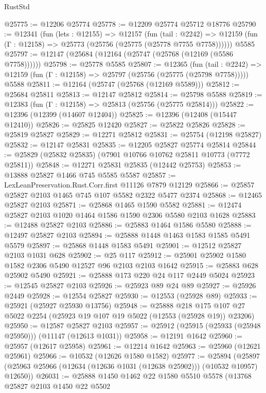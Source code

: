 \begin{lexlean}{RustStd}
\begin{coremodule}
@25775 := @12206 @25774
@25778 := @12209 @25774 @25712 @18776
@25790 := @12341
    (fun (lets : @12155) =>
    @12157
      (fun (tail : @2242) =>
      @12159 (fun (Γ : @12158) => @25773 (@25756 (@25775 (@25778 @7755 @7758))))))
    @5585
@25797 := @12147 (@25684 (@12164 (@25747 (@25768 (@12169 (@5586 @7758))))))
@25798 := @25778 @5585
@25807 := @12365
    (fun (tail : @2242) => @12159 (fun (Γ : @12158) => @25797 (@25756 (@25775 (@25798 @7758)))))
    @5588
@25811 := @12164 (@25747 (@25768 (@12169 @5589)))
@25812 := @25684 @25811
@25813 := @12147 @25812
@25814 := @25798 @5588
@25819 := @12383 (fun (Γ : @12158) => @25813 (@25756 (@25775 @25814)))
@25822 := @12396 (@12399 (@14607 @12404))
@25825 := @12396 (@12408 (@15447 @12410))
@25826 := @25825 @12420
@25827 := @25822 @25826
@25828 := @25819 @25827
@25829 := @12271 @25812
@25831 := @25754 (@12198 @25827)
@25832 := @12147 @25831
@25835 := @12205 @25827 @25774 @25814
@25844 := @25829 (@25832 @25835) (@7901 @10766 @10762 @25811 @10773 (@7772 @25811))
@25848 := @12271 @25831 @25835 (@12442 @25753)
@25853 := @13888 @25827 @1466 @745 @5585 @5587
@25857 := LexLeanPreservation.Rust.Corr.first @11126 @7879 @12129
@25866 := @25857 @25827 @2103 @1465 @745 @107 @5582 @2322 @5477 @2374
@25868 := @12465 @25827 @2103
@25871 := @25868 @1465 @1590 @5582
@25881 := @12474 @25827 @2103 @1020 @1464 @1586 @1590 @2306 @5580 @2103 @1628
@25883 := @12488 @25827 @2103
@25886 := @25883 @1464 @1586 @5580
@25888 := @12497 @25827 @2103
@25894 := @25888 @1448 @1463 @1583 @1585 @5491 @5579
@25897 := @25868 @1448 @1583 @5491
@25901 := @12512 @25827 @2103 @1031 @628
@25902 := @25 @117
@25912 := @25901 @25902 @1580 @1582 @2306 @5490 @12527 @96 @2103 @2103 @1642
@25915 := @25883 @628 @25902 @5490
@25921 := @25888 @173 @220 @24 @117 @2449 @5024
@25923 := @12545 @25827 @2103
@25926 := @25923 @89 @24 @89
@25927 := @25926 @2449
@25928 := @12554 @25827
@25930 := @12553 (@25928 @89)
@25933 := @25921 (@25927 @25930 @13756)
@25948 := @25888
    @218
    @175
    @107
    @27
    @5022
    @2254
    (@25923 @19 @107 @19 @5022 (@12553 (@25928 @19)) @23206)
@25950 := @12587 @25827 @2103
@25957 := @25912 (@25915 (@25933 (@25948 @25950))) (@11147 (@12613 @1031))
@25958 := @12191 @1642
@25960 := @25957 (@12617 @25958)
@25961 := @12214 @1642
@25963 := @25960 (@12621 @25961)
@25966 := @10532 (@12626 @1580 @1582)
@25977 := @25894
    (@25897 (@25963 @25966 (@12634 (@12636 @1031 (@12638 @25902))) (@10532 @10957) @12650))
@26031 := @25888
    @1450
    @1462
    @22
    @1580
    @5510
    @5578
    (@13768
      @25827
      @2103
      @1450
      @22
      @5502

\end{coremodule}
\end{lexlean}
